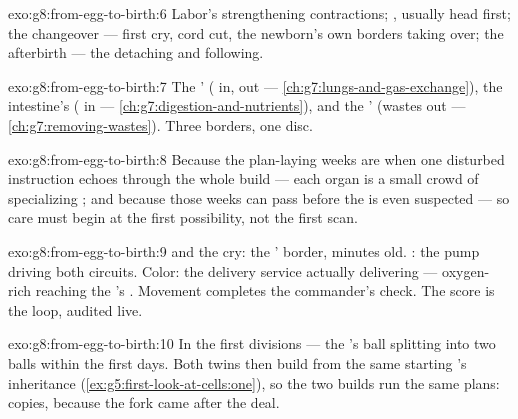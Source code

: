 \begin{solution}{exo:g8:from-egg-to-birth:6}
Labor's strengthening contractions; , usually head
first; the changeover --- first cry, cord cut, the
newborn's own borders taking over; the afterbirth --- the
 detaching and following.
\end{solution}

\begin{solution}{exo:g8:from-egg-to-birth:7}
The ' ( in,  out ---
\cref{ch:g7:lungs-and-gas-exchange}), the intestine's
( in --- \cref{ch:g7:digestion-and-nutrients}),
and the ' (wastes out ---
\cref{ch:g7:removing-wastes}). Three borders, one disc.
\end{solution}

\begin{solution}{exo:g8:from-egg-to-birth:8}
Because the plan-laying weeks are when one disturbed
instruction echoes through the whole build --- each organ
is a small crowd of specializing ; and because those
weeks can pass before the  is even suspected ---
so care must begin at the first possibility, not the
first scan.
\end{solution}

\begin{solution}{exo:g8:from-egg-to-birth:9}
 and the cry: the ' border, minutes old.
: the pump driving both circuits. Color: the
delivery service actually delivering --- oxygen-rich
 reaching the 's . Movement completes
the commander's check. The score is the loop, audited
live.
\end{solution}

\begin{solution}{exo:g8:from-egg-to-birth:10}
In the first divisions --- the 's ball splitting
into two balls within the first days. Both twins then
build from the same starting 's inheritance
(\cref{ex:g5:first-look-at-cells:one}), so the two builds
run the same plans: copies, because the fork came after
the deal.
\end{solution}

